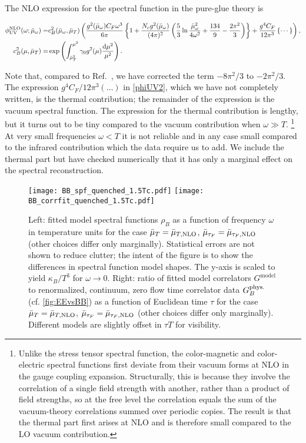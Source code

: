 \documentclass[floatfix,twocolumn,prd,showpacs,preprintnumbers,amsmath,nofootinbib,amssymb,superscriptaddress]{revtex4-2}
\def\ccite#1{Ref.~\cite{#1}} %
\begin{document}
The NLO expression for the spectral function in the pure-glue theory is \cite{Banerjee:2022uge}
\begin{widetext}
\begin{align}
\phi^{\mathrm{NLO}}_{\mathrm{UV}}(\omega; \bar{\mu}_\omega) =
& c_B^2(\bar{\mu}_\omega, \bar{\mu}_{T})  
\left( \frac{g^2(\bar{\mu}_\omega) C_F \omega^3}{6\pi} 
\left\{ 1+\frac{N_c g^2(\bar{\mu}_\omega)}{(4\pi)^2}
\left(\frac{5}{3}\ln\frac{\bar{\mu}_\omega^2}{4\omega^2}+\frac{134}{9}-\frac{2\pi^2}{3}\right) \right\}
+\frac{g^4C_F}{12\pi^3}\left\{\cdots\right\}\right), \nonumber \\
c_B^2 (\mu, \bar{\mu}_{T}) = &
\exp \left( \int_{\bar{\mu}_{T}^2}^{\mu^2} \gamma_0  g^2(\mu)   \frac{\mathrm{d}\mu^2}{\mu^2} \right).
\label{phiUV2}
\end{align}
\end{widetext}
Note that, compared to \ccite{Banerjee:2022uge}, we have corrected \cite{delacruzinprep}
the term $-8\pi^2/3$ to $-2\pi^2/3$. 
The expression $g^4 C_F/12\pi^3 (\ldots)$ in \cref{phiUV2}, which we have not completely written, is the thermal contribution; the remainder of the expression is the vacuum spectral function.
The expression for the thermal contribution is lengthy, but it turns out to be tiny compared to the vacuum contribution when $\omega \gg T$.%
\footnote{Unlike the stress tensor spectral function, the color-magnetic and color-electric spectral functions first deviate from their vacuum forms at NLO in the gauge coupling expansion.
Structurally, this is because they involve the correlation of a single field strength with another, rather than a product of field strengths, so at the free level the correlation equals the sum of the vacuum-theory correlations summed over periodic copies. The result is that the thermal part first arises at NLO and is therefore small compared to the LO vacuum contribution.}
At very small frequencies $\omega < T$ it is not reliable and in any case small compared to the infrared contribution which the data require us to add.
We include the thermal part but have checked numerically that it has only a marginal effect on the spectral reconstruction.

\begin{figure*}
    \null \hfill
    \texttt{[image: BB\_spf\_quenched\_1.5Tc.pdf]}
    \hspace{2.1cm}
    \texttt{[image: BB\_corrfit\_quenched\_1.5Tc.pdf]}
    \hfill \null
    \caption{Left: fitted model spectral functions $\rho_B$ as a function of frequency $\omega$ in temperature units for the case $\bar{\mu}_{T}=\bar{\mu}_{T,\mathrm{NLO}}$, $\bar{\mu}_{\tau_F}=\bar{\mu}_{\tau_F,\mathrm{NLO}}$ (other choices differ only marginally). Statistical errors are not shown to reduce clutter; the intent of the figure is to show the differences in spectral function model shapes. The y-axis is scaled to yield $\kappa_B/T^3$ for $\omega\rightarrow 0$. Right: ratio of fitted model correlators $G^\mathrm{model}$ to renormalized, continuum, zero flow time correlator data $G_B^{\text{phys.}}$ (cf. \cref{fig:EEvsBB}) as a function of Euclidean time $\tau$ for the case $\bar{\mu}_{T}=\bar{\mu}_{T,\mathrm{NLO}}$, $\bar{\mu}_{\tau_F}=\bar{\mu}_{\tau_F,\mathrm{NLO}}$ (other choices differ only marginally). Different models are slightly offset in $\tau T$ for visibility.}
    \label{fig:spf-and-corr-fit-results}
\end{figure*}
\end{document}

